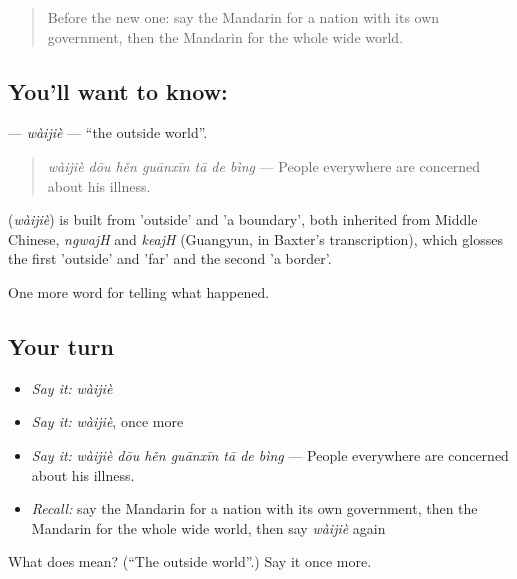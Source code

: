 \label{lesson:ZH-C326-waijie}



\begin{quote}
Before the new one: say the Mandarin for a nation with its own government, then the Mandarin for the whole wide world.
\end{quote}

\subsection*{You'll want to know: }
\textbf{} — \emph{wàijiè} — \textquotedblleft{}the outside world\textquotedblright{}.

\begin{quote}
\textbf{} \emph{wàijiè dōu hěn guānxīn tā de bìng} — People everywhere are concerned about his illness.
\end{quote}

\begin{cousinweb}
\textbf{} (\emph{wàijiè}) is built from  'outside' and  'a boundary', both inherited from Middle Chinese, \emph{ngwajH} and \emph{keajH} (Guangyun, in Baxter's transcription), which glosses the first 'outside' and 'far' and the second 'a border'.
\end{cousinweb}

\begin{grammarlens}[title={What you've built}]
One more word for telling what happened.
\end{grammarlens}

\subsection*{Your turn}
\begin{itemize}
\raggedright
  \item \emph{Say it:} \emph{wàijiè}
  \item \emph{Say it:} \emph{wàijiè}, once more
  \item \emph{Say it:} \emph{wàijiè dōu hěn guānxīn tā de bìng} — People everywhere are concerned about his illness.
  \item \emph{Recall:} say the Mandarin for a nation with its own government, then the Mandarin for the whole wide world, then say \emph{wàijiè} again
\end{itemize}

\begin{tcolorbox}[breakable,colback=teal!4,colframe=teal!35!black,title={Before you move on}]
What does  mean? (\textquotedblleft{}The outside world\textquotedblright{}.) Say it once more.
\end{tcolorbox}
